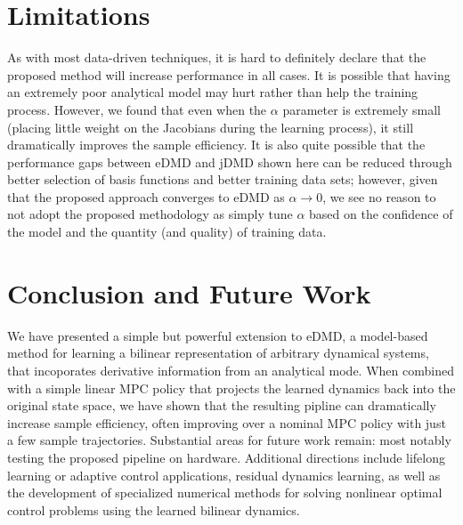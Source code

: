 \documentclass{article}
\begin{document}
\section{Limitations} \label{sec:limitations}
As with most data-driven techniques, it is hard to definitely declare that the proposed 
method will increase performance in all cases. It is possible that having an extremely poor
analytical model may hurt rather than help the training process. However, we found that even
when the $\alpha$ parameter is extremely small (placing little weight on the Jacobians 
during the learning process), it still dramatically improves the sample efficiency. It is 
also quite possible that the performance gaps between eDMD and jDMD shown here can be 
reduced through better selection of basis functions and better training data sets; however,
given that the proposed approach converges to eDMD as $\alpha \rightarrow 0$, we see no 
reason to not adopt the proposed methodology as simply tune $\alpha$ based on the 
confidence of the model and the quantity (and quality) of training data.


\section{Conclusion and Future Work} \label{sec:conclusion}
We have presented a simple but powerful extension to eDMD, a model-based method for learning
a bilinear representation of arbitrary dynamical systems, that incoporates derivative 
information from an analytical mode. When combined with a simple linear
MPC policy that projects the learned dynamics back into the original state space, we have 
shown that the resulting pipline can dramatically increase sample efficiency, often 
improving over a nominal MPC policy with just a few sample trajectories. Substantial areas 
for future work remain: most notably testing the proposed pipeline on hardware. Additional 
directions include lifelong learning or adaptive control applications, residual dynamics 
learning, as well as the development of specialized numerical methods for solving nonlinear 
optimal control problems using the learned bilinear dynamics.


\end{document}
